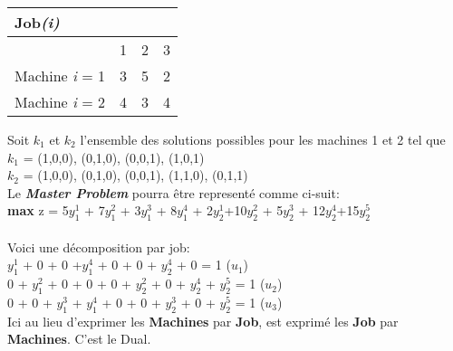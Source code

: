 \vspace{1cm}

\begin{tabular}{  p{2.5cm} c c c}
\hline
\textbf{Job}\textit{(i)} \\
\hline
 & 1 & 2 & 3 \\
 \hline
Machine \textit{i} = 1 & 3 & 5 & 2 \\
Machine \textit{i} = 2 & 4 & 3 & 4 \\
\hline
\end{tabular}

\vspace{1cm}

Soit \textit{$k_1$} et \textit{$k_2$} l'ensemble des solutions possibles pour les machines 1 et 2 tel que
\\
\textit{$k_1$} = { (1,0,0), (0,1,0), (0,0,1), (1,0,1)} \\
\textit{$k_2$} = {  (1,0,0), (0,1,0), (0,0,1), (1,1,0), (0,1,1)} \\ 

Le \textbf{\textit{Master Problem}} pourra être representé comme ci-suit:
\\
\textbf{max} z = 5$y_1^1$ + 7$y_1^2$ + 3$y_1^3$ + 8$y_1^4$ + 2$y_2^1$+10$y_2^2$ + 5$y_2^3$ + 12$y_2^4$+15$y_2^5$
\\ \\
Voici une décomposition par job: \\
$y_1^1$ + 0 + 0 +$y_1^4$ + 0 + 0 + $y_2^4$ + 0 = 1 (\textit{$u_1$}) \\
0 + $y_1^2$ + 0 + 0 + 0 + $y_2^2$ + 0 + $y_2^4$ + $y_2^5$ = 1 (\textit{$u_2$}) \\
0 + 0 + $y_1^3$ + $y_1^4$ + 0 + 0 + $y_2^3$ + 0 + $y_2^5$ = 1     (\textit{$u_3$}) \\

Ici au lieu d'exprimer les \textbf{Machines} par \textbf{Job}, est exprimé les \textbf{Job} par \textbf{Machines}. C'est le Dual.


